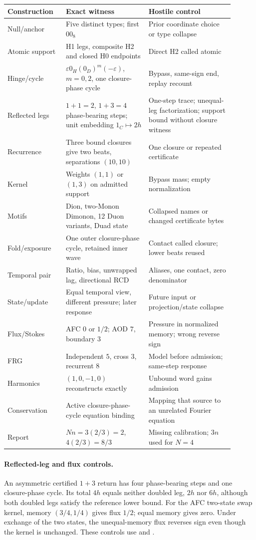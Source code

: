 \begin{longtable}{p{0.23\linewidth}p{0.33\linewidth}p{0.34\linewidth}}
\toprule Construction & Exact witness & Hostile control\\\midrule
Null/anchor & Five distinct types; first \(00_8\) & Prior coordinate choice or type collapse\\
Atomic support & H1 legs, composite H2 and closed H0 endpoints & Direct H2 called atomic\\
Hinge/cycle & \(\varepsilon0_H(0_D)^m(-\varepsilon)\), \(m=0,2\), one closure-phase cycle & Bypass, same-sign end, replay recount\\
Reflected legs & \(1+1=2\), \(1+3=4\) phase-bearing steps; unit embedding \(1_C\mapsto2h\) & One-step trace; unequal-leg factorization; support bound without closure witness\\
Recurrence & Three bound closures give two beats, separations \((10,10)\) & One closure or repeated certificate\\
Kernel & Weights \((1,1)\) or \((1,3)\) on admitted support & Bypass mass; empty normalization\\
Motifs & Dion, two-Monon Dimonon, 12 Duon variants, Duad state & Collapsed names or changed certificate bytes\\
Fold/exposure & One outer closure-phase cycle, retained inner wave & Contact called closure; lower beats reused\\
Temporal pair & Ratio, bias, unwrapped lag, directional RCD & Aliases, one contact, zero denominator\\
State/update & Equal temporal view, different pressure; later response & Future input or projection/state collapse\\
Flux/Stokes & AFC \(0\) or \(1/2\); AOD \(7\), boundary \(3\) & Pressure in normalized memory; wrong reverse sign\\
FRG & Independent \(5\), cross \(3\), recurrent \(8\) & Model before admission; same-step response\\
Harmonics & \((1,0,-1,0)\) reconstructs exactly & Unbound word gains admission\\
Conservation & Active closure-phase-cycle equation binding & Mapping that source to an unrelated Fourier equation\\
Report & \(Nn=3(2/3)=2\), \(4(2/3)=8/3\) & Missing calibration; \(3n\) used for \(N=4\)\\
\bottomrule
\end{longtable}

\paragraph{Reflected-leg and flux controls.}
An asymmetric certified \(1+3\) return has four phase-bearing steps and one
closure-phase cycle. Its total \(4h\) equals neither doubled leg, \(2h\) nor
\(6h\), although both doubled legs satisfy the reference lower bound.
For the AFC two-state swap kernel, memory \((3/4,1/4)\) gives flux \(1/2\);
equal memory gives zero. Under exchange of the two states, the unequal-memory
flux reverses sign even though the kernel is unchanged. These controls use
 and .

